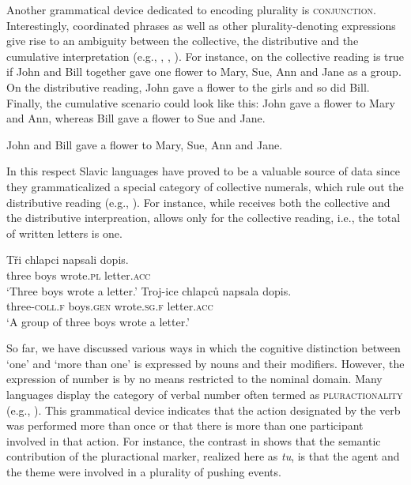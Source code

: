 \documentclass[output=paper]{langscibook}
\begin{document}
\noindent Another grammatical device dedicated to encoding plurality is \textsc{conjunction}. Interestingly, coordinated phrases as well as other plurality-denoting expressions give rise to an ambiguity between the collective, the distributive and the cumulative interpretation (e.g., \citealt{scha1981distributive, link1983logical, beck_sauerland2000cumulation, landman2000events}, , ). For instance,  on the collective reading is true if John and Bill together gave one flower to Mary, Sue, Ann and Jane as a group. On the distributive reading, John gave a flower to the girls and so did Bill. Finally, the cumulative scenario could look like this: John gave a flower to Mary and Ann, whereas Bill gave a flower to Sue and Jane.

\ea John and Bill gave a flower to Mary, Sue, Ann and Jane. \\ \hfill \citep[362]{beck_sauerland2000cumulation}\label{doc-wag:ex:conjunction}
\z

\noindent In this respect Slavic languages have proved to be a valuable source of data since they grammaticalized a special category of collective numerals, which rule out the distributive reading (e.g., \citealt{docekal2012atoms, wagiel2015sums}). For instance, while  receives both the collective and the distributive interpreation,  allows only for the collective reading, i.e., the total of written letters is one.

\ea \ea \gll Tři chlapci napsali dopis.\\
three boys wrote\textsc{.pl} letter\textsc{.acc}\\
\glt `Three boys wrote a letter.'\label{doc-wag:ex:czech-numeral} %
\ex \gll Troj-ice chlapců napsala dopis.\\
three-\textsc{coll.f} boys\textsc{.gen} wrote\textsc{.sg.f} letter\textsc{.acc}\\ %
\glt `A group of three boys wrote a letter.' \\ \hfill \citep[Czech;][113, adapted]{docekal2012atoms}\label{doc-wag:ex:czech-collective}
\z 
\z 

\noindent So far, we have discussed various ways in which the cognitive distinction between `one' and `more than one' is expressed by nouns and their modifiers. However, the expression of number is by no means restricted to the nominal domain. Many languages display the category of verbal number often termed as \textsc{pluractionality} (e.g., \citealt[Ch.~13]{lasersohn1995plurality}). This grammatical device indicates that the action designated by the verb was performed more than once or that there is more than one participant involved in that action. For instance, the contrast in  shows that the semantic contribution of the pluractional marker, realized here as \textit{tu}, is that the agent and the theme were involved in a plurality of pushing events.
\end{document}
